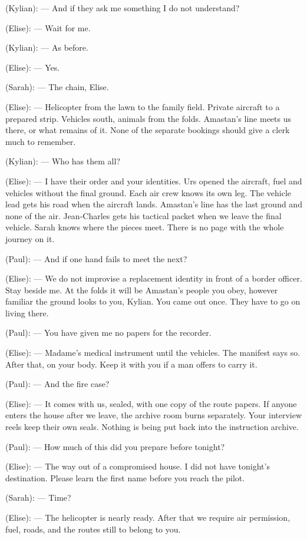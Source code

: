 \begin{room}
(Kylian): --- And if they ask me something I do not understand?

(Elise): --- Wait for me.

(Kylian): --- As before.

(Elise): --- Yes.

(Sarah): --- The chain, Elise.

(Elise): --- Helicopter from the lawn to the family field. Private aircraft to a prepared strip. Vehicles south, animals from the folds. Amastan's line meets us there, or what remains of it. None of the separate bookings should give a clerk much to remember.

(Kylian): --- Who has them all?

(Elise): --- I have their order and your identities. Urs opened the aircraft, fuel and vehicles without the final ground. Each air crew knows its own leg. The vehicle lead gets his road when the aircraft lands. Amastan's line has the last ground and none of the air. Jean-Charles gets his tactical packet when we leave the final vehicle. Sarah knows where the pieces meet. There is no page with the whole journey on it.

(Paul): --- And if one hand fails to meet the next?

(Elise): --- We do not improvise a replacement identity in front of a border officer. Stay beside me. At the folds it will be Amastan's people you obey, however familiar the ground looks to you, Kylian. You came out once. They have to go on living there.

(Paul): --- You have given me no papers for the recorder.

(Elise): --- Madame's medical instrument until the vehicles. The manifest says so. After that, on your body. Keep it with you if a man offers to carry it.

(Paul): --- And the fire case?

(Elise): --- It comes with us, sealed, with one copy of the route papers. If anyone enters the house after we leave, the archive room burns separately. Your interview reels keep their own seals. Nothing is being put back into the instruction archive.

(Paul): --- How much of this did you prepare before tonight?

(Elise): --- The way out of a compromised house. I did not have tonight's destination. Please learn the first name before you reach the pilot.

(Sarah): --- Time?

(Elise): --- The helicopter is nearly ready. After that we require air permission, fuel, roads, and the routes still to belong to you.


\end{room}
